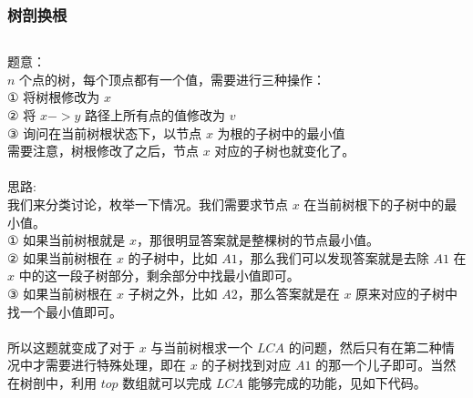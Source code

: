 \documentclass[twoside]{article}
\begin{document}
\subsubsection{树剖换根}
\begin{lstlisting}
\end{lstlisting}
题意：\\
$n$ 个点的树，每个顶点都有一个值，需要进行三种操作：\\
$①$ 将树根修改为 $x$\\
$②$ 将 $x->y$ 路径上所有点的值修改为 $v$\\
$③$ 询问在当前树根状态下，以节点 $x$ 为根的子树中的最小值\\
需要注意，树根修改了之后，节点 $x$ 对应的子树也就变化了。\\
\\
思路:\\
我们来分类讨论，枚举一下情况。我们需要求节点 $x$ 在当前树根下的子树中的最小值。\\
$①$ 如果当前树根就是 $x$，那很明显答案就是整棵树的节点最小值。\\
$②$ 如果当前树根在 $x$ 的子树中，比如 $A1$，那么我们可以发现答案就是去除 $A1$ 在 $x$ 中的这一段子树部分，剩余部分中找最小值即可。\\
$③$ 如果当前树根在 $x$ 子树之外，比如 $A2$，那么答案就是在 $x$ 原来对应的子树中找一个最小值即可。\\
\\
所以这题就变成了对于 $x$ 与当前树根求一个 $LCA$ 的问题，然后只有在第二种情况中才需要进行特殊处理，即在 $x$ 的子树找到对应 $A1$ 的那一个儿子即可。当然在树剖中，利用 $top$ 数组就可以完成 $LCA$ 能够完成的功能，见如下代码。\\
\end{document}
